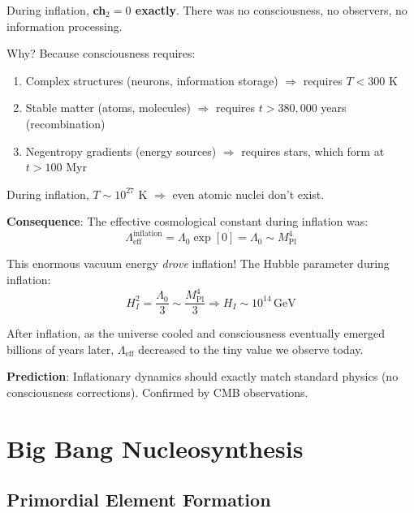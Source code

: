 \begin{keyidea}
During inflation, \textbf{ch$_2 = 0$ exactly}. There was no consciousness, no observers, no information processing.

Why? Because consciousness requires:
\begin{enumerate}
\item Complex structures (neurons, information storage) $\Rightarrow$ requires $T < 300$ K
\item Stable matter (atoms, molecules) $\Rightarrow$ requires $t > 380{,}000$ years (recombination)
\item Negentropy gradients (energy sources) $\Rightarrow$ requires stars, which form at $t > 100$ Myr
\end{enumerate}

During inflation, $T \sim 10^{27}$ K $\Rightarrow$ even atomic nuclei don't exist.

\textbf{Consequence}: The effective cosmological constant during inflation was:
\begin{equation}
\Lambda_{\text{eff}}^{\text{inflation}} = \Lambda_0 \exp[0] = \Lambda_0 \sim M_{\text{Pl}}^4
\end{equation}

This enormous vacuum energy \textit{drove} inflation! The Hubble parameter during inflation:
\begin{equation}
H_I^2 = \frac{\Lambda_0}{3} \sim \frac{M_{\text{Pl}}^4}{3} \Rightarrow H_I \sim 10^{14} \, \text{GeV}
\end{equation}

After inflation, as the universe cooled and consciousness eventually emerged billions of years later, $\Lambda_{\text{eff}}$ decreased to the tiny value we observe today.

\textbf{Prediction}: Inflationary dynamics should exactly match standard physics (no consciousness corrections). Confirmed by CMB observations\cite{planck2018}.
\end{keyidea}

\section{Big Bang Nucleosynthesis}

\subsection{Primordial Element Formation}

